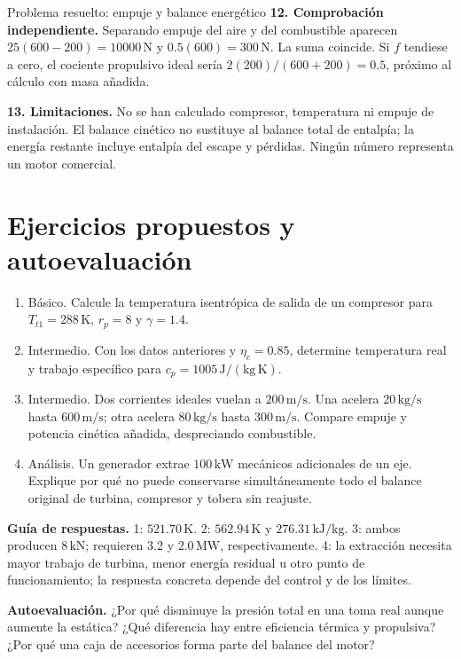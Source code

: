 \begin{studiumworked}{Problema resuelto: empuje y balance energético}
\textbf{12. Comprobación independiente.} Separando empuje del aire y del combustible aparecen $25(600-200)=10000\,\mathrm{N}$ y $0.5(600)=300\,\mathrm{N}$. La suma coincide. Si $f$ tendiese a cero, el cociente propulsivo ideal sería $2(200)/(600+200)=0.5$, próximo al cálculo con masa añadida.

\textbf{13. Limitaciones.} No se han calculado compresor, temperatura ni empuje de instalación. El balance cinético no sustituye al balance total de entalpía; la energía restante incluye entalpía del escape y pérdidas. Ningún número representa un motor comercial.


\end{studiumworked}

\section{Ejercicios propuestos y autoevaluación}
\begin{enumerate}
\item Básico. Calcule la temperatura isentrópica de salida de un compresor para $T_{t1}=288\,\mathrm{K}$, $r_p=8$ y $\gamma=1.4$.
\item Intermedio. Con los datos anteriores y $\eta_c=0.85$, determine temperatura real y trabajo específico para $c_p=1005\,\mathrm{J/(kg\,K)}$.
\item Intermedio. Dos corrientes ideales vuelan a $200\,\mathrm{m/s}$. Una acelera $20\,\mathrm{kg/s}$ hasta $600\,\mathrm{m/s}$; otra acelera $80\,\mathrm{kg/s}$ hasta $300\,\mathrm{m/s}$. Compare empuje y potencia cinética añadida, despreciando combustible.
\item Análisis. Un generador extrae $100\,\mathrm{kW}$ mecánicos adicionales de un eje. Explique por qué no puede conservarse simultáneamente todo el balance original de turbina, compresor y tobera sin reajuste.
\end{enumerate}
\textbf{Guía de respuestas.} 1: $521.70\,\mathrm{K}$. 2: $562.94\,\mathrm{K}$ y $276.31\,\mathrm{kJ/kg}$. 3: ambos producen $8\,\mathrm{kN}$; requieren $3.2$ y $2.0\,\mathrm{MW}$, respectivamente. 4: la extracción necesita mayor trabajo de turbina, menor energía residual u otro punto de funcionamiento; la respuesta concreta depende del control y de los límites.

\textbf{Autoevaluación.} ¿Por qué disminuye la presión total en una toma real aunque aumente la estática? ¿Qué diferencia hay entre eficiencia térmica y propulsiva? ¿Por qué una caja de accesorios forma parte del balance del motor?


\studiumchaptercheck
